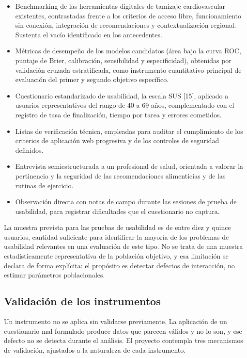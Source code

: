 \documentclass[conference]{IEEEtran}
\begin{document}
\begin{itemize}
\item Benchmarking de las herramientas digitales de tamizaje cardiovascular existentes, contrastadas frente a los criterios de acceso libre, funcionamiento sin conexión, integración de recomendaciones y contextualización regional. Sustenta el vacío identificado en los antecedentes.
\item Métricas de desempeño de los modelos candidatos (área bajo la curva ROC, puntaje de Brier, calibración, sensibilidad y especificidad), obtenidas por validación cruzada estratificada, como instrumento cuantitativo principal de evaluación del primer y segundo objetivo específico.
\item Cuestionario estandarizado de usabilidad, la escala SUS [15], aplicado a usuarios representativos del rango de 40 a 69 años, complementado con el registro de tasa de finalización, tiempo por tarea y errores cometidos.
\item Listas de verificación técnica, empleadas para auditar el cumplimiento de los criterios de aplicación web progresiva y de los controles de seguridad definidos.
\item Entrevista semiestructurada a un profesional de salud, orientada a valorar la pertinencia y la seguridad de las recomendaciones alimenticias y de las rutinas de ejercicio.
\item Observación directa con notas de campo durante las sesiones de prueba de usabilidad, para registrar dificultades que el cuestionario no captura.
\end{itemize}
La muestra prevista para las pruebas de usabilidad es de entre diez y quince usuarios, cantidad suficiente para identificar la mayoría de los problemas de usabilidad relevantes en una evaluación de este tipo. No se trata de una muestra estadísticamente representativa de la población objetivo, y esa limitación se declara de forma explícita: el propósito es detectar defectos de interacción, no estimar parámetros poblacionales.

\subsection{Validación de los instrumentos}
Un instrumento no se aplica sin validarse previamente. La aplicación de un cuestionario mal formulado produce datos que parecen válidos y no lo son, y ese defecto no se detecta durante el análisis. El proyecto contempla tres mecanismos de validación, ajustados a la naturaleza de cada instrumento.
\end{document}
